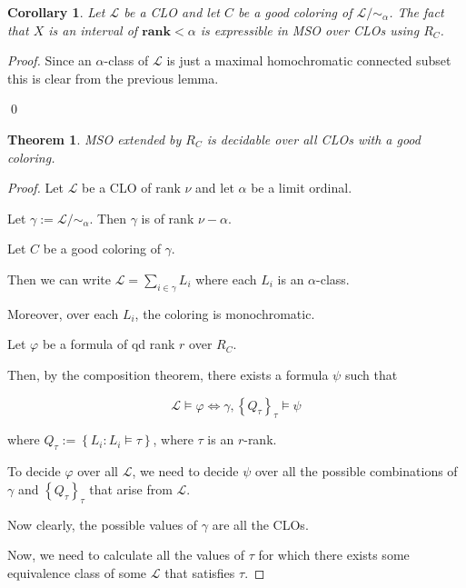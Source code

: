 \documentclass{article}
\newtheorem{theorem}{Theorem}
\newtheorem{corollary}{Corollary}
\newcommand{\braces}[1]{\left\{ {#1} \right\}}
\newcommand{\setcomp}[1]{\braces{#1}}
\newcommand{\rankp}{\mathbf{rank}}
\newcommand{\LL}{\mathcal{L}}
\begin{document}
\begin{corollary}
    Let $\LL$ be a CLO and let $C$ be a good coloring of $\LL / \sim_\alpha$.
    The fact that $X$ is an interval of $\rankp < \alpha$ is expressible in MSO over CLOs using $R_C$.
\end{corollary}

\begin{proof}
    Since an $\alpha$-class of $\LL$ is just a maximal homochromatic connected subset this is clear from the previous lemma.

    \qed
\end{proof}

\begin{theorem}
    MSO extended by $R_C$ is decidable over all CLOs with a good coloring.
\end{theorem}

\begin{proof}
    Let $\LL$ be a CLO of rank $\nu$ and let $\alpha$ be a limit ordinal.

    Let $\gamma := \LL / \sim_\alpha $. Then $\gamma$ is of rank $\nu - \alpha$.

    Let $C$ be a good coloring of $\gamma$.

    Then we can write $\LL = \sum_{i \in \gamma} L_i$ where each $L_i$ is an $\alpha$-class.
    
    Moreover, over each $L_i$, the coloring is monochromatic.

    Let $\varphi$ be a formula of qd rank $r$ over $R_C$.
    
    Then, by the composition theorem, there exists a formula $\psi$ such that

    $$
    \LL \vDash \varphi
    \iff
    \gamma, \setcomp{Q_\tau}_\tau \vDash \psi 
    $$

    where $Q_\tau := \setcomp{L_i : L_i \vDash \tau}$, where $\tau$ is an $r$-rank.

    To decide $\varphi$ over all $\LL$, we need to decide $\psi$ over all the possible combinations of
    $\gamma$ and $\setcomp{Q_\tau}_\tau$ that arise from $\LL$.

    Now clearly, the possible values of $\gamma$ are all the CLOs.
    
    Now, we need to calculate all the values of $\tau$ for which there exists some equivalence class of some $\LL$
    that satisfies $\tau$.
\end{proof}
\end{document}
